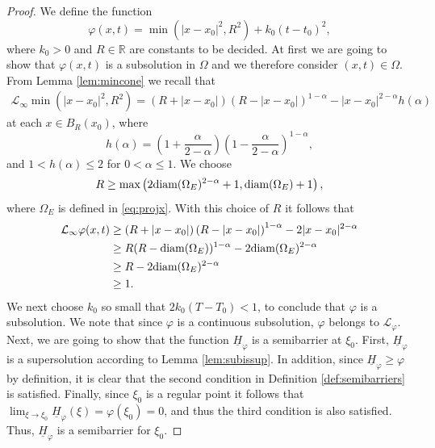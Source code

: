 \documentclass[11pt]{article}
\newcommand{\R}{\mathbb{R}}
\providecommand{\Linf}{\mathcal{L}_{\infty}}
\providecommand{\On}{\Omega_E}
\numberwithin{equation}{section}
\theoremstyle{definition}
\begin{document}
\begin{proof}
    We define the function
\begin{equation}
    \varphi(x,t)= \min(|x-x_0|^2, R^2) + k_0(t-t_0)^2,
\end{equation}
where $k_0 >0$ and $ R \in \R$ are constants to be decided. At first we are going to show that $\varphi(x,t)$ is a subsolution in $\Omega$ and we therefore consider $(x,t) \in \Omega$. From Lemma \ref{lem:mincone} we recall that 
    \begin{align*}
     \Linf \min(|x-x_0|^2, R^2)= 
                      \left(R+|x-x_0| \right) \left(R-|x-x_0| \right)^{1-\alpha} - |x-x_0|^{2-\alpha} h(\alpha)
     \end{align*} 
     at each $x \in B_R(x_0)$,
     where 
     $$
     h(\alpha) = \left(1+\frac{\alpha}{2-\alpha} \right)\left(1-\frac{\alpha}{2-\alpha} \right)^{1-\alpha},
     $$
     and $1<h(\alpha)\leq2$ for $0<\alpha \leq1$. We choose 
     \begin{align*}
         R \geq \textup{max}\left(2\textup{diam}(\Omega_E)^{2-\alpha}+1, \textup{diam}(\Omega_E) +1\right),
     \end{align*}
     where  $\On$ is defined in \eqref{eq:projx}. With this choice of $R$ it follows that
     \begin{align*}
        \Linf \varphi(x,t) &\geq \left(R+|x-x_0| \right)\left(R-|x-x_0| \right)^{1-\alpha}-2|x-x_0|^{2-\alpha} \\
        & \geq R(R-\textup{diam}(\Omega_E))^{1-\alpha}-2\textup{diam}(\Omega_E)^{2-\alpha} \\ 
        & \geq R - 2\textup{diam}(\Omega_E)^{2-\alpha}  \\
        & \geq 1.
     \end{align*}     
       We next choose $k_0$ so small that $2k_0 (T-T_0) < 1 $, to conclude that $\varphi$ is a subsolution. We note that since $\varphi$ is a continuous subsolution, $\varphi$ belongs to $\mathcal{L}_{\varphi}$. Next, we are going to show that the function $\underline{H}_{\varphi}$ is a semibarrier at $\xi_0$. First, $\underline{H}_{\varphi}$ is a supersolution according to Lemma \ref{lem:subissup}. In addition, since $\underline{H}_{\varphi} \geq \varphi$ by definition, it is clear that the second condition in Definition \ref{def:semibarriers} is satisfied.
        Finally, since $\xi_0$ is a regular point it follows that
       $\lim_{\xi \to \xi_0} \underline{H}_{\varphi}(\xi)=\varphi(\xi_0) =0$, and thus the third condition is also satisfied. Thus, $\underline{H}_{\varphi}$ is a semibarrier for $\xi_0$.
\end{proof}
\end{document}
